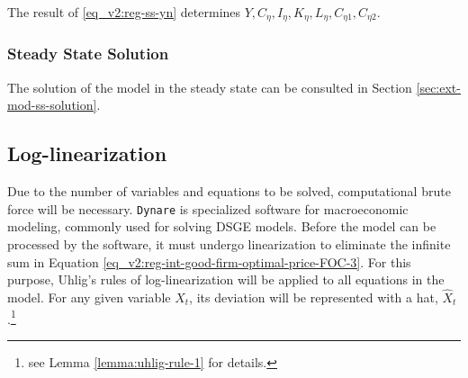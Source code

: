 \documentclass[../thesis.tex]{subfiles}
\begin{document}
\begin{comment}
Substitute \ref{eq_v2:reg-ss-C21} in \ref{eq_v2:reg-ss-C22}:
\begin{align}
	C_{22} &= C_{21} \left( \frac{1 - \omega_{21}}{\omega_{21} \theta_{P}} \right) = C_{2} \left( \frac{\omega_{21} \theta_{P}}{1 - \omega_{21}} \right)^{1 - \omega_{21}} \left( \frac{1 - \omega_{21}}{\omega_{21} \theta_{P}} \right) \tag{\ref{eq_v2:reg-ss-C22}} \implies \\
	C_{22} &= C_{2} b_{2}^{\omega_{21}} \label{eq_v2:reg-ss-C22-b}
\end{align}
	
\end{comment}








	The result of \ref{eq_v2:reg-ss-yn} determines $Y, C_{\eta}, I_{\eta}, K_{\eta}, L_{\eta}, C_{\eta 1}, C_{\eta 2}$.
	

	
	
	\subsubsection{Steady State Solution}
	
	The solution of the model in the steady state can be consulted in Section \eqref{sec:ext-mod-ss-solution}.

	\newpage
	
	
\subsection{Log-linearization}
	
Due to the number of variables and equations to be solved, computational brute force will be necessary. \texttt{Dynare} is specialized software for macroeconomic modeling, commonly used for solving DSGE models. Before the model can be processed by the software, it must undergo linearization to eliminate the infinite sum in Equation \ref{eq_v2:reg-int-good-firm-optimal-price-FOC-3}. For this purpose, Uhlig's rules of log-linearization \cite{uhlig_toolkit_1999} will be applied to all equations in the model. For any given variable $X_{t}$, its deviation will be represented with a hat, $\hat{X}_{t}$.\footnote{see Lemma \ref{lemma:uhlig-rule-1} for details.}
\end{document}
